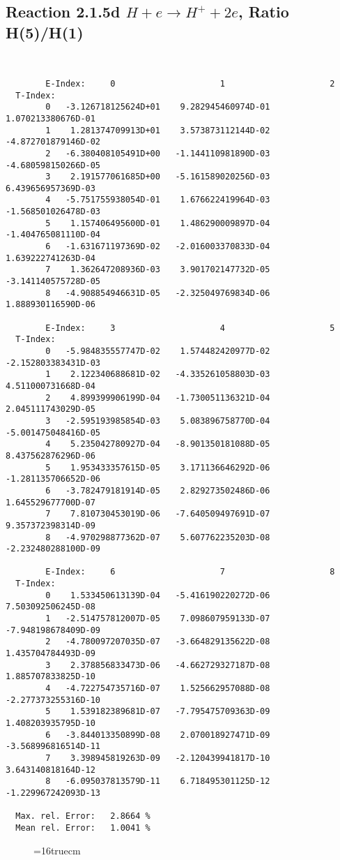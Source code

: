 \documentclass[12pt]{article}
\begin{document}
\newpage
\subsection{
Reaction 2.1.5d  $H + e \rightarrow H^+ + 2e$, Ratio H(5)/H(1)
}


\begin{small}\begin{verbatim}


        E-Index:     0                     1                     2
  T-Index:
        0   -3.126718125624D+01    9.282945460974D-01    1.070213380676D-01
        1    1.281374709913D+01    3.573873112144D-02   -4.872701879146D-02
        2   -6.380408105491D+00   -1.144110981890D-03   -4.680598150266D-05
        3    2.191577061685D+00   -5.161589020256D-03    6.439656957369D-03
        4   -5.751755938054D-01    1.676622419964D-03   -1.568501026478D-03
        5    1.157406495600D-01    1.486290009897D-04   -1.404765081110D-04
        6   -1.631671197369D-02   -2.016003370833D-04    1.639222741263D-04
        7    1.362647208936D-03    3.901702147732D-05   -3.141140575728D-05
        8   -4.908854946631D-05   -2.325049769834D-06    1.888930116590D-06

        E-Index:     3                     4                     5
  T-Index:
        0   -5.984835557747D-02    1.574482420977D-02   -2.152803383431D-03
        1    2.122340688681D-02   -4.335261058803D-03    4.511000731668D-04
        2    4.899399906199D-04   -1.730051136321D-04    2.045111743029D-05
        3   -2.595193985854D-03    5.083896758770D-04   -5.001475048416D-05
        4    5.235042780927D-04   -8.901350181088D-05    8.437562876296D-06
        5    1.953433357615D-05    3.171136646292D-06   -1.281135706652D-06
        6   -3.782479181914D-05    2.829273502486D-06    1.645529677700D-07
        7    7.810730453019D-06   -7.640509497691D-07    9.357372398314D-09
        8   -4.970298877362D-07    5.607762235203D-08   -2.232480288100D-09

        E-Index:     6                     7                     8
  T-Index:
        0    1.533450613139D-04   -5.416190220272D-06    7.503092506245D-08
        1   -2.514757812007D-05    7.098607959133D-07   -7.948198678409D-09
        2   -4.780097207035D-07   -3.664829135622D-08    1.435704784493D-09
        3    2.378856833473D-06   -4.662729327187D-08    1.885707833825D-10
        4   -4.722754735716D-07    1.525662957088D-08   -2.277373255316D-10
        5    1.539182389681D-07   -7.795475709363D-09    1.408203935795D-10
        6   -3.844013350899D-08    2.070018927471D-09   -3.568996816514D-11
        7    3.398945819263D-09   -2.120439941817D-10    3.643140818164D-12
        8   -6.095037813579D-11    6.718495301125D-12   -1.229967242093D-13

  Max. rel. Error:   2.8664 %
  Mean rel. Error:   1.0041 %

\end{verbatim}\end{small}
\begin{figure} \label{2.1.5d}
\epsfxsize=16truecm
\end{figure}
\end{document}
